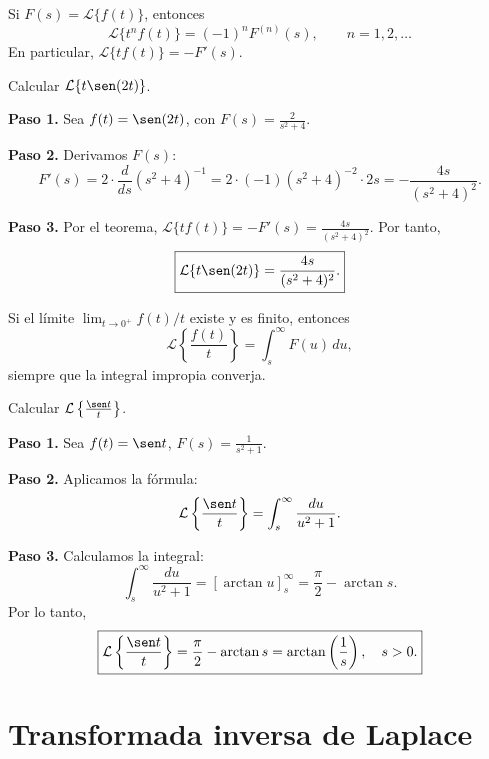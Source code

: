 \begin{theorem}
Si $F(s)=\mathcal{L}\{f(t)\}$, entonces
\[
\mathcal{L}\{t^n f(t)\} = (-1)^n F^{(n)}(s),\qquad n=1,2,\dots
\]
En particular, $\mathcal{L}\{t f(t)\} = -F'(s)$.
\end{theorem}

\begin{example}
Calcular $\mathcal{L}\{t \sen(2t)\}$.
\begin{myproof}
\textbf{Paso 1.} Sea $f(t)=\sen(2t)$, con $F(s)=\frac{2}{s^2+4}$.

\textbf{Paso 2.} Derivamos $F(s)$:
\[
F'(s) = 2\cdot \frac{d}{ds}(s^2+4)^{-1} = 2\cdot (-1)(s^2+4)^{-2}\cdot 2s = -\frac{4s}{(s^2+4)^2}.
\]

\textbf{Paso 3.} Por el teorema, $\mathcal{L}\{t f(t)\} = -F'(s) = \frac{4s}{(s^2+4)^2}$.
Por tanto,
\[
\boxed{\mathcal{L}\{t\sen(2t)\} = \frac{4s}{(s^2+4)^2}.}
\]
\end{myproof}
\end{example}

\begin{theorem}
Si el límite $\lim_{t\to0^+} f(t)/t$ existe y es finito, entonces
\[
\mathcal{L}\left\{\frac{f(t)}{t}\right\} = \int_s^\infty F(u)\,du,
\]
siempre que la integral impropia converja.
\end{theorem}

\begin{example}
Calcular $\mathcal{L}\left\{\frac{\sen t}{t}\right\}$.
\begin{myproof}
\textbf{Paso 1.} Sea $f(t)=\sen t$, $F(s)=\frac{1}{s^2+1}$.

\textbf{Paso 2.} Aplicamos la fórmula:
\[
\mathcal{L}\left\{\frac{\sen t}{t}\right\} = \int_s^\infty \frac{du}{u^2+1}.
\]

\textbf{Paso 3.} Calculamos la integral:
\[
\int_s^\infty \frac{du}{u^2+1} = \left[\arctan u\right]_s^\infty = \frac{\pi}{2} - \arctan s.
\]
Por lo tanto,
\[
\boxed{\mathcal{L}\left\{\frac{\sen t}{t}\right\} = \frac{\pi}{2} - \arctan s = \arctan\left(\frac{1}{s}\right),\quad s>0.}
\]
\end{myproof}
\end{example}

\section{Transformada inversa de Laplace}

